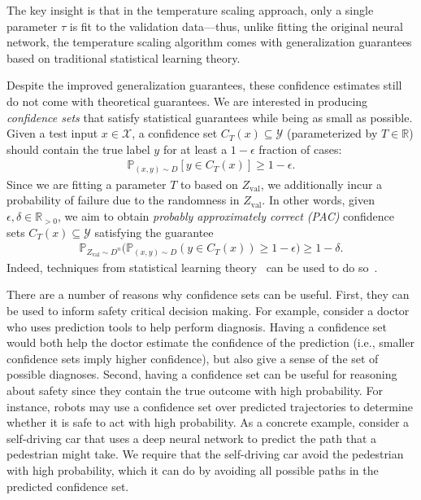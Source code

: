 \documentclass{article} \usepackage{iclr2020_conference,times}
\renewcommand{\(}						{\left(}
\renewcommand{\)}						{\right)}
\renewcommand{\[}						{\left[}
\renewcommand{\]}						{\right]}
\newcommand{\<}						{\left<}
\renewcommand{\>}						{\right>}
\begin{document}
The key insight is that in the temperature scaling approach, only a single parameter $\tau$ is fit to the validation data---thus, unlike fitting the original neural network, the temperature scaling algorithm comes with generalization guarantees based on traditional statistical learning theory.

Despite the improved generalization guarantees, these confidence estimates still do not come with theoretical guarantees. We are interested in producing \emph{confidence sets} that satisfy statistical guarantees while being as small as possible. Given a test input $x\in\mathcal{X}$, a confidence set $C_T(x)\subseteq\mathcal{Y}$ (parameterized by $T\in\mathbb{R}$) should contain the true label $y$ for at least a $1-\epsilon$ fraction of cases:
\begin{align*}
\mathbb{P}_{(x,y)\sim D}[y\in C_T(x)]\ge1-\epsilon.
\end{align*}
Since we are fitting a parameter $T$ to based on $Z_{\text{val}}$, we additionally incur a probability of failure due to the randomness in $Z_{\text{val}}$. In other words, given $\epsilon,\delta\in\mathbb{R}_{>0}$, we aim to obtain \emph{probably approximately correct (PAC)} confidence sets $C_T(x)\subseteq\mathcal{Y}$ satisfying the guarantee
\begin{align*}
\mathbb{P}_{Z_{\text{val}}\sim D^n}\bigg(\mathbb{P}_{(x,y)\sim D}(y\in C_T(x))\ge1-\epsilon\bigg)\ge1-\delta.
\end{align*}
Indeed, techniques from statistical learning theory~\citep{vapnik1999overview} can be used to do so~\citep{vovk2013conditional}.

There are a number of reasons why confidence sets can be useful. First, they can be used to inform safety critical decision making. For example, consider a doctor who uses prediction tools to help perform diagnosis. Having a confidence set would both help the doctor estimate the confidence of the prediction (i.e., smaller confidence sets imply higher confidence), but also give a sense of the set of possible diagnoses. Second, having a confidence set can be useful for reasoning about safety since they contain the true outcome with high probability. For instance, robots may use a confidence set over predicted trajectories to determine whether it is safe to act with high probability. As a concrete example, consider a self-driving car that uses a deep neural network to predict the path that a pedestrian might take. We require that the self-driving car avoid the pedestrian with high probability, which it can do by avoiding all possible paths in the predicted confidence set.
\end{document}

